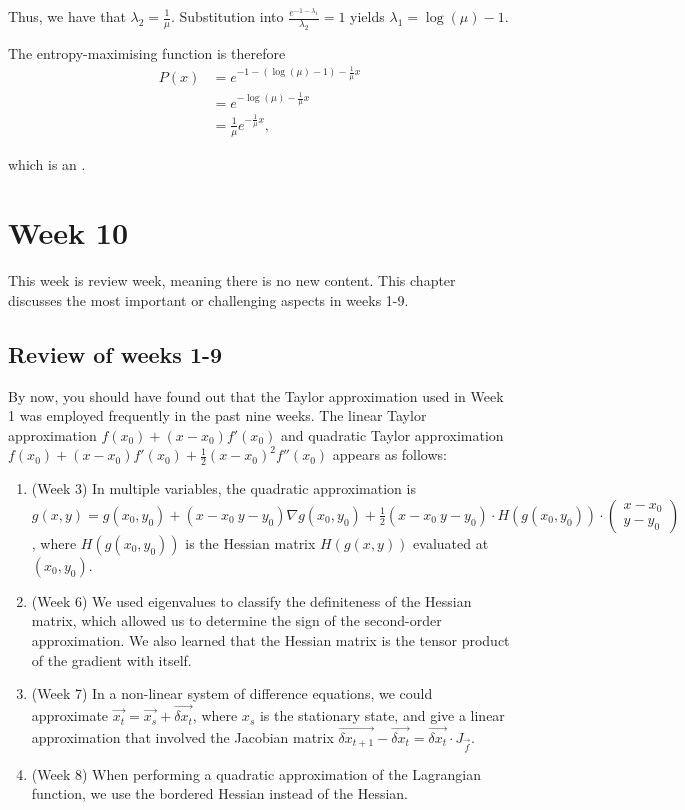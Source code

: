 \documentclass[a4paper, 12pt,oneside,openany]{book}
\begin{document}
Thus, we have that $\lambda_2=\frac{1}{\mu}$. Substitution into $\frac{e^{-1-\lambda_1}}{\lambda_2}=1$ yields $\lambda_1 = \log(\mu)-1$. 

The entropy-maximising function is therefore \begin{align*}P(x) &= e^{-1-(\log(\mu)-1)-\frac{1}{\mu}x} \\&= e^{-\log(\mu) - \frac{1}{\mu}x} \\&= \frac{1}{\mu} e^{-\frac{1}{\mu}x}, \end{align*}

which is an . 

\chapter{Week 10}

This week is review week, meaning there is no new content. This chapter discusses the most important or challenging aspects in weeks 1-9.

\section{Review of weeks 1-9}

By now, you should have found out that the Taylor approximation used in Week 1 was employed frequently in the past nine weeks. The linear Taylor approximation $f(x_0) + (x-x_0) f'(x_0)$ and quadratic Taylor approximation $f(x_0) + (x-x_0) f'(x_0) + \frac{1}{2} (x-x_0)^2 f''(x_0)$ appears as follows:

\begin{enumerate}
	\item (Week 3) In multiple variables, the quadratic approximation is $g(x, y) = g(x_0, y_0) + (x-x_0 \ y-y_0) \nabla g(x_0, y_0) + \frac{1}{2} (x-x_0 \ y-y_0) \cdot H(g(x_0, y_0)) \cdot \begin{pmatrix} x-x_0 \\ y-y_0 \end{pmatrix}$, where $H(g(x_0, y_0))$ is the Hessian matrix $H(g(x, y))$ evaluated at $(x_0, y_0)$.
	\item (Week 6) We used eigenvalues to classify the definiteness of the Hessian matrix, which allowed us to determine the sign of the second-order approximation. We also learned that the Hessian matrix is the tensor product of the gradient with itself.
	\item (Week 7) In a non-linear system of difference equations, we could approximate $\vec{x_t} = \vec{x_s}+\vec{\delta x_t}$, where $x_s$ is the stationary state, and give a linear approximation that involved the Jacobian matrix $\vec{\delta x_{t+1}} - \vec{\delta x_t} = \vec{\delta x_t} \cdot J_{\vec{f}}.$
	\item (Week 8) When performing a quadratic approximation of the Lagrangian function, we use the bordered Hessian instead of the Hessian. 
\end{enumerate}
\end{document}
